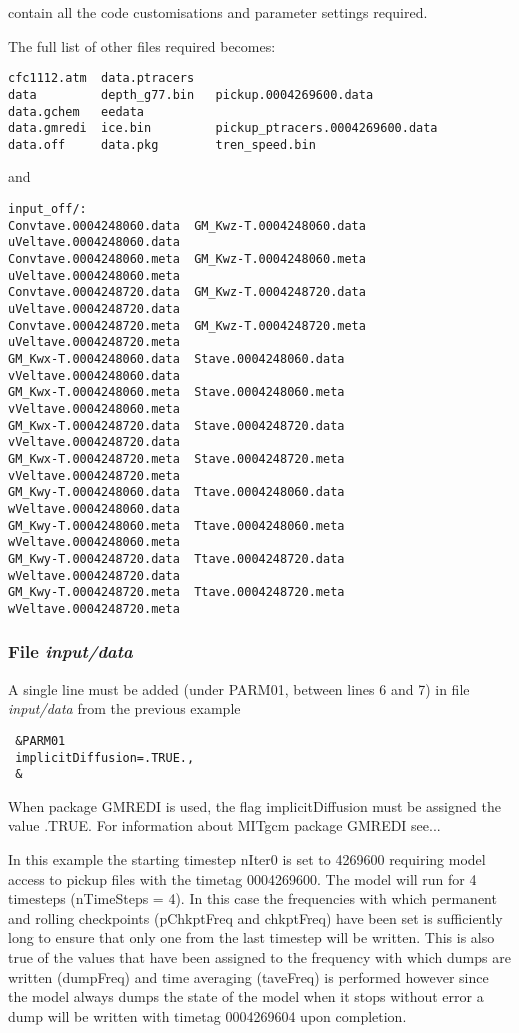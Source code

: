 \noindent contain all the code customisations and parameter settings
required.

\noindent The full list of other files required becomes:

\begin{verbatim}
cfc1112.atm  data.ptracers   
data         depth_g77.bin   pickup.0004269600.data
data.gchem   eedata          
data.gmredi  ice.bin         pickup_ptracers.0004269600.data
data.off     data.pkg        tren_speed.bin
\end{verbatim}

\noindent and

\begin{verbatim}
input_off/:
Convtave.0004248060.data  GM_Kwz-T.0004248060.data  uVeltave.0004248060.data
Convtave.0004248060.meta  GM_Kwz-T.0004248060.meta  uVeltave.0004248060.meta
Convtave.0004248720.data  GM_Kwz-T.0004248720.data  uVeltave.0004248720.data
Convtave.0004248720.meta  GM_Kwz-T.0004248720.meta  uVeltave.0004248720.meta
GM_Kwx-T.0004248060.data  Stave.0004248060.data     vVeltave.0004248060.data
GM_Kwx-T.0004248060.meta  Stave.0004248060.meta     vVeltave.0004248060.meta
GM_Kwx-T.0004248720.data  Stave.0004248720.data     vVeltave.0004248720.data
GM_Kwx-T.0004248720.meta  Stave.0004248720.meta     vVeltave.0004248720.meta
GM_Kwy-T.0004248060.data  Ttave.0004248060.data     wVeltave.0004248060.data
GM_Kwy-T.0004248060.meta  Ttave.0004248060.meta     wVeltave.0004248060.meta
GM_Kwy-T.0004248720.data  Ttave.0004248720.data     wVeltave.0004248720.data
GM_Kwy-T.0004248720.meta  Ttave.0004248720.meta     wVeltave.0004248720.meta
\end{verbatim}


\subsubsection{File {\it input/data}}
\label{www:tutorials}

\noindent A single line must be added (under PARM01, between lines 6
and 7) in file {\it input/data} from the previous example

\begin{verbatim}
 &PARM01
 implicitDiffusion=.TRUE.,
 &
\end{verbatim}

\noindent When package GMREDI is used, the flag implicitDiffusion must
be assigned the value .TRUE. For information about MITgcm package
GMREDI see...

\vspace{0.5cm}
\noindent In this example the starting timestep nIter0 is set to
4269600 requiring model access to pickup files with the timetag
0004269600. The model will run for 4 timesteps (nTimeSteps = 4). In
this case the frequencies with which permanent and rolling checkpoints
(pChkptFreq and chkptFreq) have been set is sufficiently long to
ensure that only one from the last timestep will be written. This is
also true of the values that have been assigned to the frequency with
which dumps are written (dumpFreq) and time averaging (taveFreq) is
performed however since the model always dumps the state of the model
when it stops without error a dump will be written with timetag
0004269604 upon completion.


